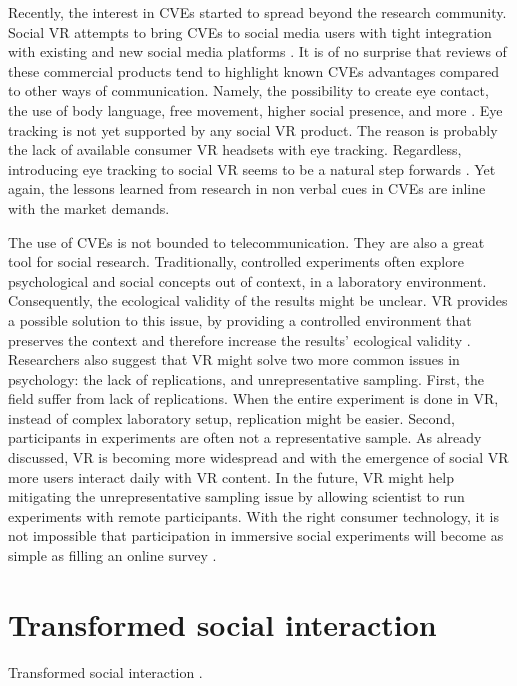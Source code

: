 \documentclass[]{simple-thesis}
\begin{document}
Recently, the interest in CVEs started to spread beyond the research community.
Social VR attempts to bring CVEs to social media users with tight integration with existing and new social media platforms \citep{Bonasio2016}.
It is of no surprise that reviews of these commercial products tend to highlight known CVEs advantages compared to other ways of communication.
Namely, the possibility to create eye contact, the use of body language, free movement, higher social presence, and more \citep{Rosedale2015}.
Eye tracking is not yet supported by any social VR product.
The reason is probably the lack of available consumer VR headsets with eye tracking.
Regardless, introducing eye tracking to social VR seems to be a natural step forwards \citep{Langley2017}.
Yet again, the lessons learned from research in non verbal cues in CVEs are inline with the market demands.

The use of CVEs is not bounded to telecommunication.
They are also a great tool for social research.
Traditionally, controlled experiments often explore psychological and social concepts out of context, in a laboratory environment.
Consequently, the ecological validity of the results might be unclear.
VR provides a possible solution to this issue, by providing a controlled environment that preserves the context and therefore increase the results' ecological validity \citep{Loomis1999}.
Researchers also suggest that VR might solve two more common issues in psychology: the lack of replications, and unrepresentative sampling.
First, the field suffer from lack of replications.
When the entire experiment is done in VR, instead of complex laboratory setup, replication might be easier.
Second, participants in experiments are often not a representative sample.
As already discussed, VR is becoming more widespread and with the emergence of social VR more users interact daily with VR content.
In the future, VR might help mitigating the unrepresentative sampling issue by allowing scientist to run experiments with remote participants.
With the right consumer technology, it is not impossible that participation in immersive social experiments will become as simple as filling an online survey \citep{Blascovich2002}.

\section{Transformed social interaction}

Transformed social interaction \citep{Bailenson2004, Bailenson2008}.
\end{document}
